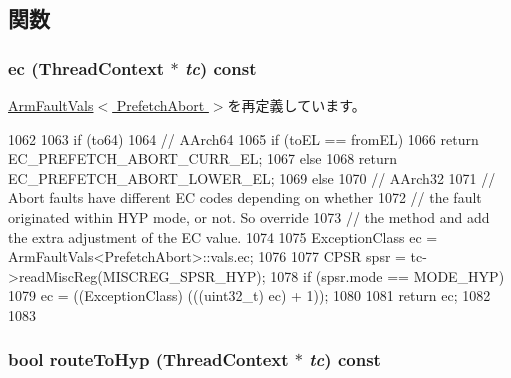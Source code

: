 \subsection{関数}
\hypertarget{classArmISA_1_1PrefetchAbort_aefab73b22a74d7c48b8a23230906d7cd}{
\subsubsection[{ec}]{ ec ({\bf ThreadContext} $\ast$ {\em tc}) const}}
\label{classArmISA_1_1PrefetchAbort_aefab73b22a74d7c48b8a23230906d7cd}


\hyperlink{classArmISA_1_1ArmFaultVals_aa4dd5fb47a1253dbe17e692e905a8c7c}{ArmFaultVals$<$ PrefetchAbort $>$}を再定義しています。


\begin{DoxyCode}
1062 {
1063     if (to64) {
1064         // AArch64
1065         if (toEL == fromEL)
1066             return EC_PREFETCH_ABORT_CURR_EL;
1067         else
1068             return EC_PREFETCH_ABORT_LOWER_EL;
1069     } else {
1070         // AArch32
1071         // Abort faults have different EC codes depending on whether
1072         // the fault originated within HYP mode, or not. So override
1073         // the method and add the extra adjustment of the EC value.
1074 
1075         ExceptionClass ec = ArmFaultVals<PrefetchAbort>::vals.ec;
1076 
1077         CPSR spsr = tc->readMiscReg(MISCREG_SPSR_HYP);
1078         if (spsr.mode == MODE_HYP) {
1079             ec = ((ExceptionClass) (((uint32_t) ec) + 1));
1080         }
1081         return ec;
1082     }
1083 }
\end{DoxyCode}
\hypertarget{classArmISA_1_1PrefetchAbort_a16facd13ba8e6d15d2b865882c379d5f}{
\subsubsection[{routeToHyp}]{\setlength{\rightskip}{0pt plus 5cm}bool routeToHyp ({\bf ThreadContext} $\ast$ {\em tc}) const}}
\label{classArmISA_1_1PrefetchAbort_a16facd13ba8e6d15d2b865882c379d5f}


